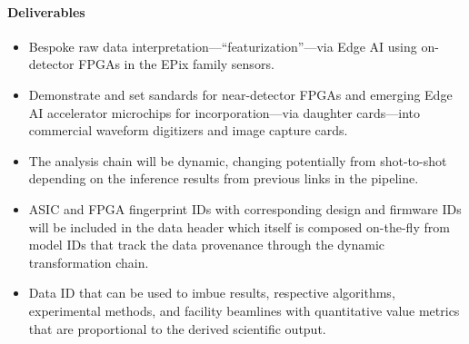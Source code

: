 \documentclass{article}
\begin{document}
\paragraph{Deliverables}
\begin{itemize}
	\item Bespoke raw data interpretation---``featurization''---via Edge AI using on-detector FPGAs in the EPix family sensors.
	\item Demonstrate and set sandards for near-detector FPGAs and emerging Edge AI accelerator microchips for incorporation---via daughter cards---into commercial waveform digitizers and image capture cards.
	\item The analysis chain will be dynamic, changing potentially from shot-to-shot depending on the inference results from previous links in the pipeline.
	\item ASIC and FPGA fingerprint IDs with corresponding design and firmware IDs will be included in the data header which itself is composed on-the-fly from model IDs that track the data provenance through the dynamic transformation chain.
	\item Data ID that can be used to imbue results, respective algorithms, experimental methods, and facility beamlines with quantitative value metrics that are proportional to the derived scientific output.
\end{itemize}


\end{document}
